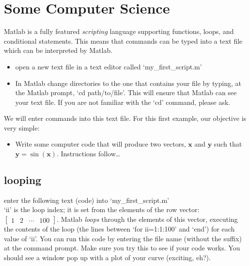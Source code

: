 \documentclass[letter]{article}
\begin{document}
\section*{Some Computer Science}
Matlab is a fully featured \emph{scripting} language supporting functions,
loops, and conditional statements.  This means that commands can be
typed into a text file which can be interpreted by Matlab.

\begin{itemize}
\item open a new text file in a text editor called
  `my\_first\_script.m'
\item In Matlab change directories to the one that contains your
  file by typing, at the Matlab prompt, `cd path/to/file'.  This will
  ensure that Matlab can see your text file.  If you are not familiar
  with the `cd' command, please ask.
\end{itemize}

We will enter commands into this text file.  For this first example,
our objective is very simple:

\begin{itemize}
\item Write some computer code that will produce two vectors,
  $\mathbf{x}$ and $\mathbf{y}$ such that
  $\mathbf{y}=\sin(\mathbf{x})$. Instructions 
  follow\ldots
\end{itemize}



\subsection*{looping}

enter the following text (code) into `my\_first\_script.m' \\



`ii' is the loop index; it is set from the elements of the row vector:
$\left[\begin{array}{ccccc} 1 & 2 & \cdots & 100 \end{array}\right]$.
Matlab \emph{loops} through the elements of this vector, executing the
contents of the loop (the lines between `for ii=1:1:100' and `end')
for each value of `ii'.  You can run this code by entering the file
name (without the suffix) at the command
prompt.  Make sure you try this to see if your code works.  You should
see a window pop up with a plot of your curve (exciting, eh?).
\end{document}
